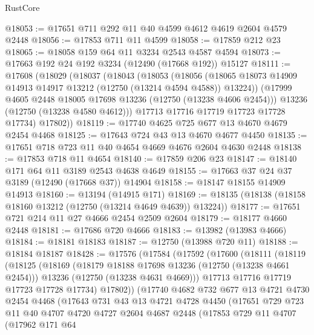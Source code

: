 \begin{lexlean}{RustCore}
\begin{coremodule}
@18053 := @17651 @711 @292 @11 @40 @4599 @4612 @4619 @2604 @4579 @2448
@18056 := @17853 @711 @11 @4599
@18058 := @17859 @212 @23
@18065 := @18058 @159 @64 @11 @3234 @2543 @4587 @4594
@18073 := @17663 @192 @24 @192 @3234 (@12490 (@17668 @192)) @15127
@18111 := @17608
    (@18029
      (@18037
        (@18043
          (@18053
            (@18056
              (@18065 @18073 @14909 @14913 @14917 @13212 (@12750 (@13214 @4594 @4588)) @13224))
            (@17999 @4605 @2448 @18005 @17698 @13236 (@12750 (@13238 @4606 @2454)))
            @13236
            (@12750 (@13238 @4580 @4612)))
          @17713
          @17716
          @17719
          @17723
          @17728
          @17734)
        @17802))
@18119 := @17740 @4625 @725 @677 @13 @4670 @4679 @2454 @4468
@18125 := @17643 @724 @43 @13 @4670 @4677 @4450
@18135 := @17651 @718 @723 @11 @40 @4654 @4669 @4676 @2604 @4630 @2448
@18138 := @17853 @718 @11 @4654
@18140 := @17859 @206 @23
@18147 := @18140 @171 @64 @11 @3189 @2543 @4638 @4649
@18155 := @17663 @37 @24 @37 @3189 (@12490 (@17668 @37)) @14904
@18158 := @18147 @18155 @14909 @14913
@18160 := @13194 (@14915 @171)
@18169 := @18135 (@18138 (@18158 @18160 @13212 (@12750 (@13214 @4649 @4639)) @13224))
@18177 := @17651 @721 @214 @11 @27 @4666 @2454 @2509 @2604
@18179 := @18177 @4660 @2448
@18181 := @17686 @720 @4666
@18183 := @13982 (@13983 @4666)
@18184 := @18181 @18183
@18187 := @12750 (@13988 @720 @11)
@18188 := @18184 @18187
@18428 := @17576
    (@17584
      (@17592
        (@17600
          (@18111
            (@18119
              (@18125
                (@18169
                  (@18179 @18188 @17698 @13236 (@12750 (@13238 @4661 @2454)))
                  @13236
                  (@12750 (@13238 @4631 @4669)))
                @17713
                @17716
                @17719
                @17723
                @17728
                @17734)
              @17802))
          (@17740
            @4682
            @732
            @677
            @13
            @4721
            @4730
            @2454
            @4468
            (@17643
              @731
              @43
              @13
              @4721
              @4728
              @4450
              (@17651
                @729
                @723
                @11
                @40
                @4707
                @4720
                @4727
                @2604
                @4687
                @2448
                (@17853
                  @729
                  @11
                  @4707
                  (@17962
                    @171
                    @64

\end{coremodule}
\end{lexlean}
